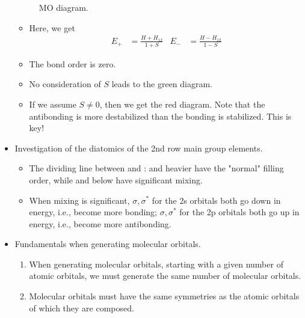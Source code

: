 \documentclass[../notes.tex]{subfiles}
\begin{document}
\begin{itemize}
\begin{figure}[H]
        \caption{ MO diagram.}
        \label{fig:MOsHe2}
    \end{figure}
    \begin{itemize}
        \item Here, we get
        \begin{align*}
            E_+ &= \frac{H+H_{12}}{1+S}&
            E_- &= \frac{H-H_{12}}{1-S}
        \end{align*}
        \item The bond order is zero.
        \item No consideration of $S$ leads to the green diagram.
        \item If we assume $S\neq 0$, then we get the red diagram. Note that the antibonding is more destabilized than the bonding is stabilized. This is key!
    \end{itemize}
    \item Investigation of the diatomics of the 2nd row main group elements.
    \begin{itemize}
        \item The dividing line between  and :  and heavier have the "normal" filling order, while  and below have significant mixing.
        \item When mixing is significant, $\sigma,\sigma^*$ for the 2s orbitals both go down in energy, i.e., become more bonding; $\sigma,\sigma^*$ for the 2p orbitals both go up in energy, i.e., become more antibonding.
    \end{itemize}
    \item Fundamentals when generating molecular orbitals.
    \begin{enumerate}
        \item When generating molecular orbitals, starting with a given number of atomic orbitals, we must generate the same number of molecular orbitals.
        \item Molecular orbitals must have the same symmetries as the atomic orbitals of which they are composed.

\end{enumerate}
\end{itemize}
\end{document}
